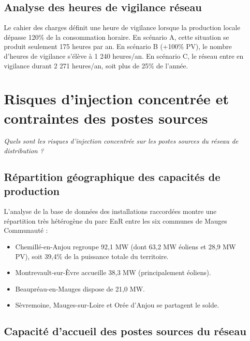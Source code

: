 \documentclass[12pt, a4paper]{report}
\begin{document}
\section{Analyse des heures de vigilance réseau}

Le cahier des charges définit une heure de vigilance lorsque la production locale dépasse 120\% de la consommation horaire. En scénario A, cette situation se produit seulement 175 heures par an. En scénario B (+100\% PV), le nombre d'heures de vigilance s'élève à 1 240 heures/an. En scénario C, le réseau entre en vigilance durant 2 271 heures/an, soit plus de 25\% de l'année.


\chapter{Risques d'injection concentrée et contraintes des postes sources}

\emph{Quels sont les risques d'injection concentrée sur les postes sources du réseau de distribution ?}

\section{Répartition géographique des capacités de production}

L'analyse de la base de données des installations raccordées \cite{odre_registre} montre une répartition très hétérogène du parc EnR entre les six communes de Mauges Communauté :
\begin{itemize}
  \item Chemillé-en-Anjou regroupe 92,1 MW (dont 63,2 MW éoliens et 28,9 MW PV), soit 39,4\% de la puissance totale du territoire.
  \item Montrevault-sur-Èvre accueille 38,3 MW (principalement éoliens).
  \item Beaupréau-en-Mauges dispose de 21,0 MW.
  \item Sèvremoine, Mauges-sur-Loire et Orée d'Anjou se partagent le solde.
\end{itemize}

\section{Capacité d'accueil des postes sources du réseau}
\end{document}
